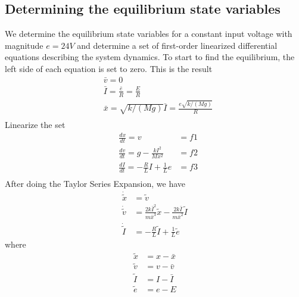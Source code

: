 \documentclass{article}
\begin{document}
    \subsection{Determining the equilibrium state variables}
    We determine the equilibrium state variables for a constant input voltage with magnitude $e = 24 V$ and determine a set of first-order linearized differential equations describing the system dynamics.
    To start to find the equilibrium, the left side of each equation is set to zero. This is the result
    \begin{equation}
        \begin{aligned}
            &\bar{v} = 0\\
            &\bar{I} = \frac{\bar{e}}{R}=\frac{E}{R}\\ 
            &\bar{x} = \sqrt{k/(Mg)}\bar{I} = \frac{e\sqrt{k/(Mg)}}{R}\\
        \end{aligned}
    \end{equation}
    Linearize the set
    \begin{equation}
        \begin{aligned}
            &\frac{dx}{dt} = v &= f1\\
            &\frac{dv}{dt} = g - \frac{kI^2}{Mx^2} &= f2\\
            &\frac{dI}{dt} = -\frac{R}{L}I + \frac{1}{L}e &= f3 \\
        \end{aligned}
    \end{equation}
    After doing the Taylor Series Expansion, we have  
    \begin{equation}
        \begin{aligned}
            \dot{\tilde{x}}&=\tilde{v}\\
            \dot{\tilde{v}}&=\frac{2k\bar{I}^2}{m\bar{x}^3}\tilde{x}-\frac{2k\bar{I}}{m\bar{x}^2}\tilde{I}\\
            \dot{\tilde{I}}&=-\frac{R}{L}\tilde{I}+\frac{1}{L}\tilde{e}
        \end{aligned}
    \end{equation}
    where
    \begin{equation}
        \begin{aligned}
            \tilde{x}&=x-\bar{x}\\
            \tilde{v}&=v-\bar{v}\\
            \tilde{I}&=I-\bar{I}\\
            \tilde{e}&=e-E
        \end{aligned}
    \end{equation}
\end{document}
